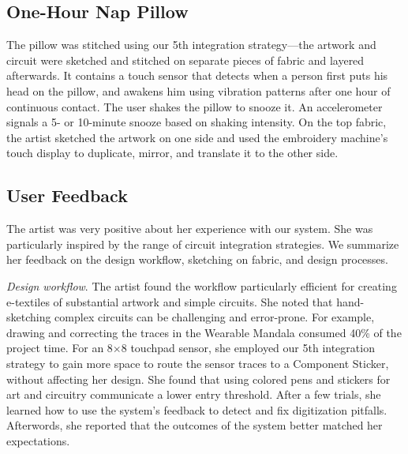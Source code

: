 \documentclass[header.tex]{subfiles}
\begin{document}
\subsection{One-Hour Nap Pillow}
The pillow was stitched using our 5th integration strategy---the artwork and circuit were sketched and stitched on separate pieces of fabric and layered afterwards. It contains a touch sensor that detects when a person first puts his head on the pillow, and awakens him using vibration patterns after one hour of continuous contact. The user shakes the pillow to snooze it. An accelerometer signals a 5- or 10-minute snooze based on shaking intensity. On the top fabric, the artist sketched the artwork on one side and used the embroidery machine's touch display to duplicate, mirror, and translate it to the other side. 


\subsection{User Feedback}
The artist was very positive about her experience with our system. She was particularly inspired by the range of circuit integration strategies. We summarize her feedback on the design workflow, sketching on fabric, and design processes. 


\textit{Design workflow}. The artist found the workflow particularly efficient for creating e-textiles of substantial artwork and simple circuits. She noted that hand-sketching complex circuits can be challenging and error-prone. For example, drawing and correcting the traces in the Wearable Mandala consumed 40\% of the project time. For an 8$\times$8 touchpad sensor, she employed our 5th integration strategy to gain more space to route the sensor traces to a Component Sticker, without affecting her design. She found that using colored pens and stickers for art and circuitry communicate a lower entry threshold. %
After a few trials, she learned how to use the system's feedback to detect and fix digitization pitfalls. Afterwords, she reported that the outcomes of the system better matched her expectations.
\end{document}
